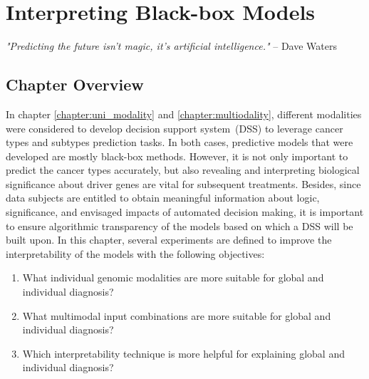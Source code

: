 \chapter{Interpreting Black-box Models}\label{chapter:xai}

\textit{"Predicting the future isn't magic, it's artificial intelligence."} -- Dave Waters 

\section{Chapter Overview}
In chapter \ref{chapter:uni_modality} and \ref{chapter:multiodality}, different modalities were considered to develop decision support system~(DSS) to leverage cancer types and subtypes prediction tasks. In both cases, predictive models that were developed are mostly black-box methods. However, it is not only important to predict the cancer types accurately, but also revealing and interpreting biological significance about driver genes are vital for subsequent treatments. Besides, since data subjects are entitled to obtain meaningful information about logic, significance, and envisaged impacts of automated decision making, it is important to ensure algorithmic transparency of the models based on which a DSS will be built upon. In this chapter, several experiments are defined to improve the interpretability of the models with the following objectives:

\begin{enumerate}[noitemsep]
    \item What individual genomic modalities are more suitable for global and individual diagnosis? 
    \item What multimodal input combinations are more suitable for global and individual diagnosis?
    \item Which interpretability technique is more helpful for explaining global and individual diagnosis?
\end{enumerate}

